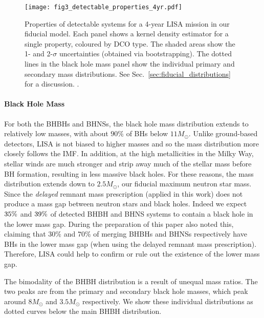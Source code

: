 \begin{figure*}[t]
    \centering
    \texttt{[image: fig3\_detectable\_properties\_4yr.pdf]}
    \caption{Properties of detectable systems for a 4-year LISA mission in our fiducial model. Each panel shows a kernel density estimator for a single property, coloured by DCO type. The shaded areas show the 1- and 2-$\sigma$ uncertainties (obtained via bootstrapping). The dotted lines in the black hole mass panel show the individual primary and secondary mass distributions. See Sec.~\ref{sec:fiducial_distributions} for a discussion. \href{https://github.com/TomWagg/detecting-DCOs-in-LISA/blob/main/paper/figures/fig3_detectable_properties_4yr.pdf}{\faFileImage} \href{https://github.com/TomWagg/detecting-DCOs-in-LISA/blob/main/paper/figure_notebooks/fiducial.ipynb}{\faBook}.}
    \label{fig:fiducial_pdf_distributions}
\end{figure*}

\paragraph{Black Hole Mass}
For both the BHBHs and BHNSs, the black hole mass distribution extends to relatively low masses, with about $90\%$ of BHs below $11 \unit{M_{\odot}}$. Unlike ground-based detectors, LISA is not biased to higher masses and so the mass distribution more closely follows the IMF. In addition, at the high metallicities in the Milky Way, stellar winds are much stronger and strip away much of the stellar mass before BH formation, resulting in less massive black holes. For these reasons, the mass distribution extends down to $2.5 \unit{M_{\odot}}$, our fiducial maximum neutron star mass. Since the \citet{Fryer+2012} \textit{delayed} remnant mass prescription (applied in this work) does not produce a mass gap between neutron stars and black holes. Indeed we expect $35\%{}$ and $39\%{}$ of detected BHBH and BHNS systems to contain a black hole in the lower mass gap. During the preparation of this paper \citet{Shao+2021} also noted this, claiming that $30\%$ and $70\%$ of merging BHBHs and BHNSs respectively have BHs in the lower mass gap (when using the delayed remnant mass prescription). Therefore, LISA could help to confirm or rule out the existence of the lower mass gap.

The bimodality of the BHBH distribution is a result of unequal mass ratios. The two peaks are from the primary and secondary black hole masses, which peak around $8 \unit{M_{\odot}}$ and $3.5 \unit{M_{\odot}}$ respectively. We show these individual distributions as dotted curves below the main BHBH distribution.

